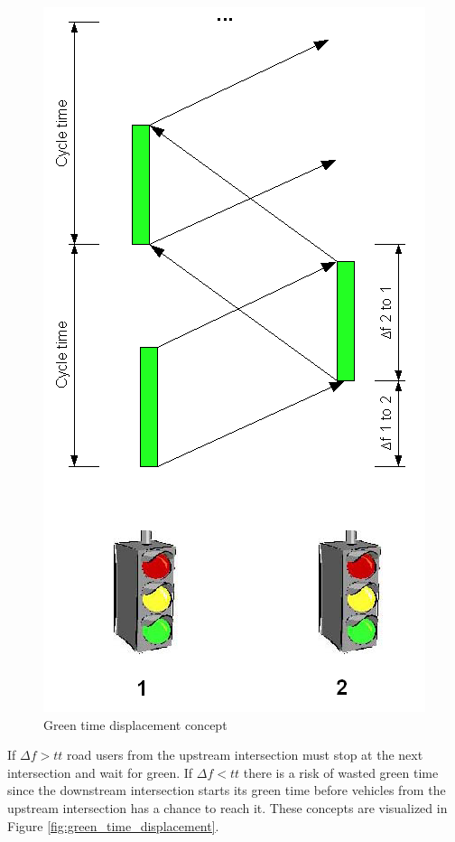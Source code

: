 \begin{figure}[htbp]
\centering
\includegraphics[scale=0.35]{green_time_displacement_and_cycle_time.png}
\caption{Green time displacement concept}
\label{fig:green_time_displacement_concept}
\end{figure}

If $\Delta f > tt$ road users from the upstream intersection must stop at the next intersection and wait for green. If $\Delta f < tt$ there is a risk of wasted green time since the downstream intersection starts its green time before vehicles from the upstream intersection has a chance to reach it. These concepts are visualized in Figure \ref{fig:green_time_displacement}.

